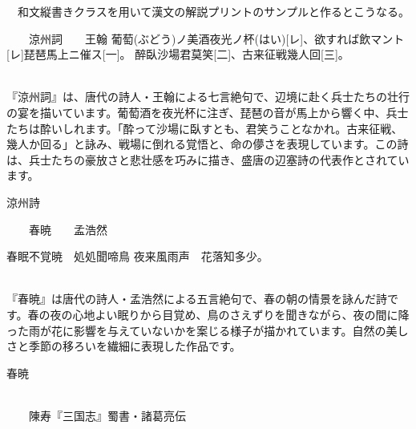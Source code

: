 \documentclass[b5paper, 8pt, twoside]{ltjtreport}
\begin{document}

\begin{multicols*}{2}
\br
　和文縦書きクラスを用いて漢文の解説プリントのサンプルと作るとこうなる。\br

{\large 　　涼州詞}　　王翰
\vspace*{1em}
\Kanbun 
葡萄(ぶどう){ノ}美酒夜光{ノ}杯(はい)[レ]、欲{すれば}飲{マント}[レ]琵琶馬上{ニ}催{ス}[一]。
醉臥沙場君莫笑[二]、古来征戦幾人回[三]。
\EndKanbun

{\kan\printkanbunnopar\par}

\\
『涼州詞』は、唐代の詩人・王翰による七言絶句で、辺境に赴く兵士たちの壮行の宴を描いています。葡萄酒を夜光杯に注ぎ、琵琶の音が馬上から響く中、兵士たちは酔いしれます。「酔って沙場に臥すとも、君笑うことなかれ。古来征戦、幾人か回る」と詠み、戦場に倒れる覚悟と、命の儚さを表現しています。この詩は、兵士たちの豪放さと悲壮感を巧みに描き、盛唐の辺塞詩の代表作とされています。

\begin{simple}[王翰]{涼州詩}
  \kan\printkanbunnopar\par
\end{simple}

{\large 　　春暁}　　孟浩然
\vspace*{1em}

\Kanbun
春眠不覚暁　処処聞啼鳥
夜来風雨声　花落知多少。
\EndKanbun

{\kan\printkanbunnopar\par}

\\
『春暁』は唐代の詩人・孟浩然による五言絶句で、春の朝の情景を詠んだ詩です。春の夜の心地よい眠りから目覚め、鳥のさえずりを聞きながら、夜の間に降った雨が花に影響を与えていないかを案じる様子が描かれています。自然の美しさと季節の移ろいを繊細に表現した作品です。

\begin{ascolorbox4}[孟浩然]{春暁}
  \kan\printkanbunnopar\par
\end{ascolorbox4}

\newpage

\\
\br
{\large 　　陳寿『三国志』蜀書・諸葛亮伝}
\vspace*{1em}


\end{multicols*}
\end{document}
